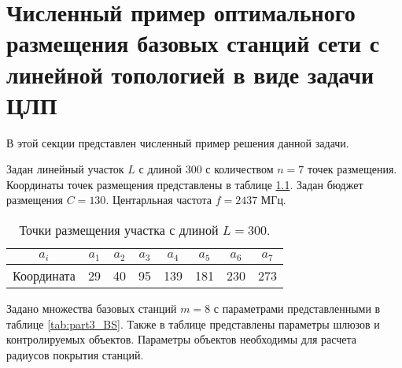 \chapter{Численный пример оптимального размещения базовых станций сети с линейной топологией в виде задачи ЦЛП}\label{app:ilp_solution}
В этой секции представлен численный пример решения данной задачи.

Задан линейный участок $L$ с длиной 300 с количеством $n=7$ точек размещения. Координаты точек размещения представлены в таблице \cref{tab:part3_placed_point}.  Задан бюджет размещения $C=130$. Центарльная частота $f = 2437$ МГц. 

\begin{table}[h!]\centering
  \begin{tabular}{|c||c|c|c|c|c|c|c|}\hline
    $a_i$ & $a_1$ &  $a_2$ & $a_3$ & $a_4$ & $a_5$ & $a_6$ & $a_7$ \\ \hline \hline
    Координата & 29 & 40 & 95 & 139 & 181 & 230 & 273 \\ \hline
\end{tabular}\caption{Точки размещения участка с длиной $L = 300$.}\label{tab:part3_placed_point}
\end{table}

Задано множества базовых станций $m = 8$ с параметрами представленными в таблице \cref{tab:part3_BS}. Также в таблице представлены параметры шлюзов и контролируемых объектов. Параметры объектов необходимы для расчета радиусов покрытия станций.

